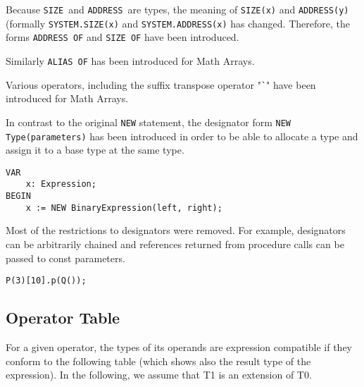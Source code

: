 \documentclass[a4wide,11pt]{article}
\newcommand{\ADDRESS}{\lstinline"ADDRESS"}
\newcommand{\SIZE}{\lstinline"SIZE"}
\begin{document}
\begin{annotation}
Because \SIZE\ and \ADDRESS\ are types, the meaning of \lstinline"SIZE(x)" and \lstinline"ADDRESS(y)" (formally \lstinline"SYSTEM.SIZE(x)" and \lstinline"SYSTEM.ADDRESS(x)" has changed.
Therefore, the forms \lstinline"ADDRESS OF" and \lstinline"SIZE OF" have been introduced.

Similarly \lstinline"ALIAS OF" has been introduced for Math Arrays.

Various operators, including the suffix transpose operator "\lstinline~`~" have been introduced for Math Arrays.


In contrast to the original \lstinline"NEW" statement, the designator form \lstinline"NEW Type(parameters)" has been introduced in order to be able to allocate a type and assign it to a base type at the same type.
\begin{lstlisting}[style=example]
VAR
	x: Expression;
BEGIN
	x := NEW BinaryExpression(left, right);
\end{lstlisting}

Most of the restrictions to designators were removed.
For example, designators can be arbitrarily chained and references returned from procedure calls can be passed to const parameters.

\begin{lstlisting}[style=example, caption=Example of a syntactially valid designator]
	P(3)[10].p(Q());
\end{lstlisting}

\end{annotation}


\subsection{Operator Table}\label{section:OperatoTable}
For a given operator, the types of its operands are expression compatible if they conform to the following table (which shows also the result type of the expression).
In the following, we assume that T1 is an extension of T0.
\end{document}
